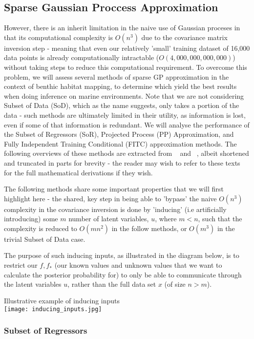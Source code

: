 \documentclass[10pt,sts]{article}
\begin{document}
\begin{multicols}{2}
    \subsection{Sparse Gaussian Proccess Approximation} However, there is an inherit limitation in the naive use of Gaussian proceses in that its computational complexity is $O(n^3)$ due to the covariance matrix inversion step - meaning that even our relatively 'small' training dataset of 16,000 data points is already computationally intractable ($O(4,000,000,000,000)$) without taking steps to reduce this computational requirement. To overcome this problem, we will assess several methods of sparse GP approximation in the context of benthic habitat mapping, to determine which yield the best results when doing inference on marine environments. Note that we are not considering Subset of Data (SoD), which as the name suggests, only takes a portion of the data - such methods are ultimately limited in their utility, as information is lost, even if some of that information is redundant. We will analyse the performance of the Subset of Regressors (SoR), Projected Process (PP) Approximation, and Fully Independent Training Conditional (FITC) approximation methods. The following overviews of these methods are extracted from ~\citet{candela05} and ~\citet{rasmussen06}, albeit shortened and truncated in parts for brevity - the reader may wish to refer to these texts for the full mathematical derivations if they wish.

    The following methods share some important properties that we will first highlight here - the shared, key step in being able to 'bypass' the naive $O(n^3)$ complexity in the covariance inversion is done by 'inducing' (i.e artificially introducing) some $m$ number of latent variables, $u$, where $m < n$, such that the complexity is reduced to $O(mn^2)$ in the follow methods, or $O(m^3)$ in the trivial Subset of Data case. 

    The purpose of such inducing inputs, as illustrated in the diagram below, is to restrict our $f, f_*$ (our known values and unknown values that we want to calculate the posterior probability for) to only be able to communicate through the latent variables $u$, rather than the full data set $x$ (of size $n > m$).

    {\scriptsize Illustrative example of inducing inputs}\\
    \texttt{[image: inducing\_inputs.jpg]}

    \subsubsection{Subset of Regressors}


\end{multicols}
\end{document}
